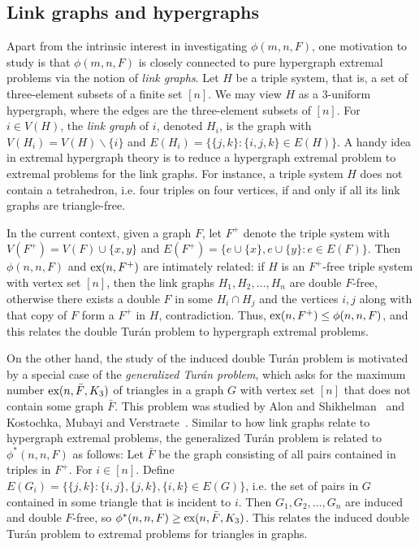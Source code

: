 \documentclass[12pt]{article}
\newcommand*{\ex}{\textnormal{ex}}
\begin{document}
\subsection{Link graphs and hypergraphs}

Apart from the intrinsic interest in investigating $\phi(m, n, F)$, one motivation to study is that $\phi(m, n, F)$ is closely connected to pure hypergraph extremal problems via the notion of \textit{link graphs}. Let $H$ be a triple system, that is, a set of three-element subsets of a finite set $[n]$. We may view $H$ as a 3-uniform hypergraph, where the edges are the three-element subsets of $[n]$. For $i \in V(H)$, the \textit{link graph} of $i$,  denoted $H_i$, is the graph with $V(H_i) = V(H) \backslash \{i\}$ and $E(H_i) = \{\{j, k\} : \{i, j, k\} \in E(H)\}$. A handy idea in extremal hypergraph theory is to reduce a hypergraph extremal problem to extremal problems for the link graphs. For instance, a triple system $H$ does not contain a tetrahedron, i.e. four triples on four vertices, if and only if all its link graphs are triangle-free.

In the current context, given a graph $F$, let $F^+$ denote the triple system with $V(F^+) = V(F) \cup \{x, y\}$ and $E(F^+) = \{e \cup \{x\}, e \cup \{y\} : e \in E(F)\}$. Then $\phi(n, n, F)$ and $\ex(n, F^+)$ are intimately related: if $H$ is an $F^+$-free triple system with vertex set $[n]$, then the link graphs $H_1, H_2, \dots, H_n$ are double $F$-free, otherwise there exists a double $F$ in some $H_i \cap H_j$ and the vertices $i, j$ along with that copy of $F$ form a $F^+$ in $H$, contradiction. Thus, $\ex(n, F^+) \leq \phi(n, n, F)$, and this relates the double Tur\'{a}n problem to hypergraph extremal problems.

On the other hand, the study of the induced double Tur\'{a}n problem is motivated by a special case of the \textit{generalized Tur\'{a}n problem}, which asks for the maximum number $\ex(n, \bar{F}, K_3)$ of triangles in a graph $G$ with vertex set $[n]$ that does not contain some graph $\bar{F}$. This problem was studied by Alon and Shikhelman~\cite{AlonShikhelman2016} and Kostochka, Mubayi and Verstraete~\cite{KostochkaMubayiV2015, MubayiMukherjee2023, MubayiV2016}. Similar to how link graphs relate to hypergraph extremal problems, the generalized Tur\'{a}n problem is related to $\phi^*(n, n, F)$ as follows: Let $\bar{F}$ be the graph consisting of all pairs contained in triples in $F^+$. For $i \in [n]$. Define $E(G_i) = \{\{j, k\} : \{i, j\}, \{j, k\}, \{i, k\} \in E(G)\}$, i.e. the set of pairs in $G$ contained in some triangle that is incident to $i$. Then $G_1, G_2, \dots, G_n$ are induced and double $F$-free, so $\phi^*(n, n, F) \geq \ex(n, \bar{F}, K_3)$. This relates the induced double Tur\'{a}n problem to extremal problems for triangles in graphs.
\end{document}
